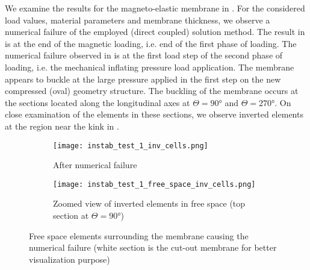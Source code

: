 We examine the results for the magneto-elastic membrane in . For the considered load values, material parameters and membrane thickness, we observe a numerical failure of the employed (direct coupled) solution method. The result in  is at the end of the magnetic loading, i.e. end of the first phase of loading. The numerical failure observed in  is at the first load step of the second phase of loading, i.e. the mechanical inflating pressure load application. The membrane appears to buckle at the large pressure applied in the first step on the new compressed (oval) geometry structure. The buckling of the membrane occurs at the sections located along the longitudinal axes at $\Theta = \ang{90}$ and $\Theta = \ang{270}$. On close examination of the elements in these sections, we observe inverted elements at the region near the kink in . \par 

\begin{figure}[h]
\centering
\begin{subfigure}{0.4\textwidth}
\centering
\texttt{[image: instab\_test\_1\_inv\_cells.png]}
\caption{After numerical failure}
\label{fig:3.17.1}
\end{subfigure}
\begin{subfigure}{0.58\textwidth}
\centering
\texttt{[image: instab\_test\_1\_free\_space\_inv\_cells.png]}
\caption{Zoomed view of inverted elements in free space (top section at $\Theta = \ang{90}$)}
\label{fig:3.17.2}
\end{subfigure}
\caption{Free space elements surrounding the membrane causing the numerical failure (white section is the cut-out membrane for better visualization purpose)}
\label{fig:3.17}
\end{figure}

